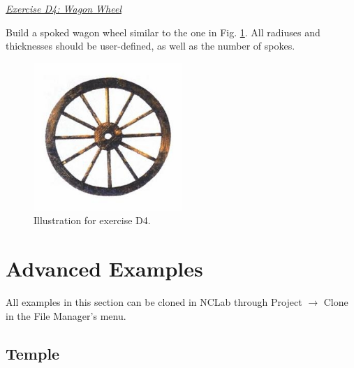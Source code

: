 \documentclass[article,A4,12pt]{llncs}
\begin{document}
\noindent
\underline{\em Exercise D4: Wagon Wheel}

Build a spoked wagon wheel similar to the one in Fig. \ref{fig:wheel-1}. All radiuses 
and thicknesses should be user-defined, as well as the number of spokes.

\newpage

\begin{figure}[!ht]
\begin{center}
\includegraphics[width=0.5\textwidth]{img/wagonwheel-1.png}
\end{center}
\vspace{-8mm}
\caption{Illustration for exercise D4.}
\label{fig:wheel-1}
\end{figure}
\noindent



\section{Advanced Examples}

All examples in this section can be cloned in NCLab through 
Project $\rightarrow$ Clone in the File Manager's menu.

\subsection{Temple}
\end{document}

